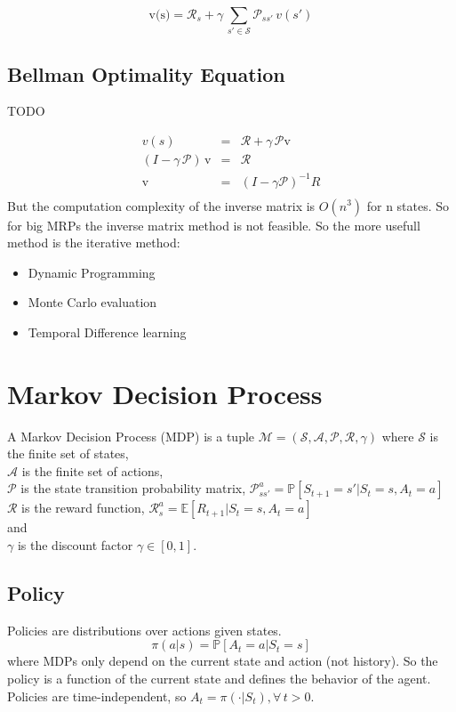 \[
    \text{v(s)} = \mathcal{R}_{s} + \gamma\,\sum_{s'\in\mathcal{S}}^{}\mathcal{P}_{ss'}\,v(s')
\]

\subsection{Bellman Optimality Equation}\label{subsec:bellman-optimality-equation}
TODO

\begin{eqnarray*}
    v(s) &=& \mathcal{R}+\gamma\,\mathcal{P}\text{v}\\
    (I - \gamma\,\mathcal{P})\,\text{v} &=& \mathcal{R}\\
    \text{v} &=& (I-\gamma\mathcal{P})^{-1} R\\
\end{eqnarray*}
But the computation complexity of the inverse matrix is $O(n^3)$ for n states.
So for big MRPs the inverse matrix method is not feasible.
So the more usefull method is the iterative method:
\begin{itemize}
    \item Dynamic Programming
    \item Monte Carlo evaluation
    \item Temporal Difference learning
\end{itemize}


\section{Markov Decision Process}\label{sec:markov-decision-process2}
\begin{definition}
    A Markov Decision Process (MDP) is a tuple $\mathcal{M}=(\mathcal{S},\mathcal{A},\mathcal{P},\mathcal{R},\gamma)$
    where
    $\mathcal{S}$ is the finite set of states, \\
    $\mathcal{A}$ is the finite set of actions, \\
    $\mathcal{P}$ is the state transition probability matrix,
    $\mathcal{P}_{ss'}^{a}=\mathbb{P}[S_{t+1}=s'|S_t=s,A_t=a]$\\
    $\mathcal{R}$ is the reward function, $\mathcal{R}_{s}^{a}=\mathbb{E}[R_{t+1}|S_t=s,A_t=a]$ \\
    and  \\
    $\gamma$ is the discount factor $\gamma\in[0,1]$. \\
\end{definition} %

\subsection{Policy}\label{subsec:policy}
Policies are distributions over actions given states.
\[
    \pi(a|s) = \mathbb{P}[A_t=a|S_t=s]
\]
where MDPs only depend on the current state and action (not history).
So the policy is a function of the current state and defines
the behavior of the agent.
Policies are time-independent, so $A_t=\pi(\cdot|S_t),\forall\,t>0$.


